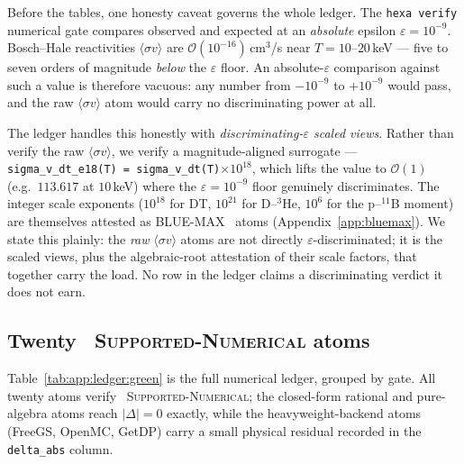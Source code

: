 Before the tables, one honesty caveat governs the whole ledger. The
\texttt{hexa verify} numerical gate compares observed and expected at an
\emph{absolute} epsilon $\varepsilon=10^{-9}$. Bosch--Hale reactivities
$\langle\sigma v\rangle$ are $\mathcal{O}(10^{-16})$\,cm$^3$/s near
$T=10$--$20$\,keV --- five to seven orders of magnitude \emph{below} the
$\varepsilon$ floor. An absolute-$\varepsilon$ comparison against such a
value is therefore vacuous: any number from $-10^{-9}$ to $+10^{-9}$
would pass, and the raw $\langle\sigma v\rangle$ atom would carry no
discriminating power at all.

The ledger handles this honestly with \emph{discriminating-$\varepsilon$
scaled views}. Rather than verify the raw $\langle\sigma v\rangle$, we
verify a magnitude-aligned surrogate --- \texttt{sigma\_v\_dt\_e18(T) =
sigma\_v\_dt(T)$\times10^{18}$}, which lifts the value to
$\mathcal{O}(1)$ (e.g.\ $113.617$ at $10$\,keV) where the
$\varepsilon=10^{-9}$ floor genuinely discriminates. The integer scale
exponents ($10^{18}$ for DT, $10^{21}$ for D--$^3$He, $10^{6}$ for the
p--$^{11}$B moment) are themselves attested as BLUE-MAX
\tierBlue\ atoms (Appendix~\ref{app:bluemax}). We state this plainly:
the \emph{raw} $\langle\sigma v\rangle$ atoms are not directly
$\varepsilon$-discriminated; it is the scaled views, plus the
algebraic-root attestation of their scale factors, that together carry
the load. No row in the ledger claims a discriminating verdict it does
not earn.

\subsection{Twenty \tierGreen\ \textsc{Supported-Numerical} atoms}
\label{app:verify-ledger:green}

Table~\ref{tab:app:ledger:green} is the full numerical ledger, grouped
by gate. All twenty atoms verify \tierGreen\ \textsc{Supported-Numerical};
the closed-form rational and pure-algebra atoms reach $|\Delta|=0$
exactly, while the heavyweight-backend atoms (FreeGS, OpenMC, GetDP)
carry a small physical residual recorded in the \texttt{delta\_abs}
column.

